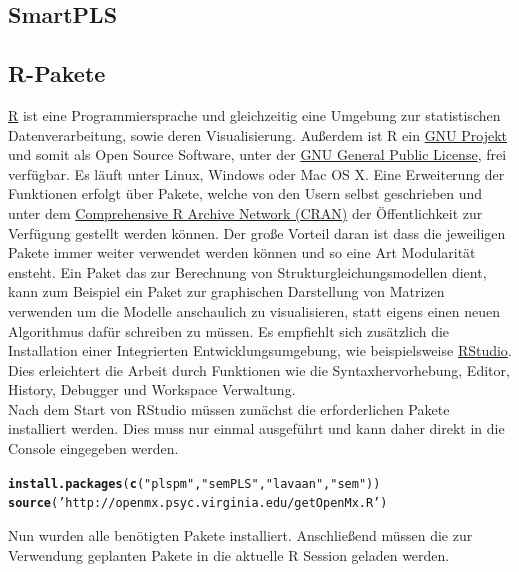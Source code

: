 \documentclass{article}\usepackage[]{graphicx}\usepackage[]{color}
\makeatletter
\newcommand{\hlstr}[1]{\textcolor[rgb]{0.192,0.494,0.8}{#1}}%
\newcommand{\hlstd}[1]{\textcolor[rgb]{0.345,0.345,0.345}{#1}}%
\newcommand{\hlkwd}[1]{\textcolor[rgb]{0.737,0.353,0.396}{\textbf{#1}}}%
\newenvironment{kframe}{%
 \def\at@end@of@kframe{}%
 \ifinner\ifhmode%
  \def\at@end@of@kframe{\end{minipage}}%
  \begin{minipage}{\columnwidth}%
 \fi\fi%
 \def\FrameCommand##1{\hskip\@totalleftmargin \hskip-\fboxsep
 \colorbox{shadecolor}{##1}\hskip-\fboxsep
     \hskip-\linewidth \hskip-\@totalleftmargin \hskip\columnwidth}%
 \MakeFramed {\advance\hsize-\width
   \@totalleftmargin\z@ \linewidth\hsize
   \@setminipage}}%
 {\par\unskip\endMakeFramed%
 \at@end@of@kframe}
\newenvironment{knitrout}{}{} %
\makeatother
\begin{document}
\subsection{SmartPLS}

\subsection{R-Pakete}
\href{http://www.r-project.org/}{R} ist eine Programmiersprache und gleichzeitig eine Umgebung zur statistischen Datenverarbeitung, sowie deren Visualisierung. Außerdem ist R ein \href{http://www.gnu.org/}{GNU Projekt} und somit als Open Source Software, unter der \href{http://www.r-project.org/COPYING}{GNU General Public License}, frei verfügbar. Es läuft unter Linux, Windows oder Mac OS X. Eine Erweiterung der Funktionen erfolgt über Pakete, welche von den Usern selbst geschrieben und unter dem \href{http://cran.r-project.org/}{Comprehensive R Archive Network (CRAN)} der Öffentlichkeit zur Verfügung gestellt werden können. Der große Vorteil daran ist dass die jeweiligen Pakete immer weiter verwendet werden können und so eine Art Modularität ensteht. Ein Paket das zur Berechnung von Strukturgleichungsmodellen dient, kann zum Beispiel ein Paket zur graphischen Darstellung von Matrizen verwenden um die Modelle anschaulich zu visualisieren, statt eigens einen neuen Algorithmus dafür schreiben zu müssen. Es empfiehlt sich zusätzlich die Installation einer Integrierten Entwicklungsumgebung, wie beispielsweise \href{http://www.rstudio.com/}{RStudio}. Dies erleichtert die Arbeit durch Funktionen wie die Syntaxhervorhebung, Editor, History, Debugger und Workspace Verwaltung.\\
Nach dem Start von RStudio müssen zunächst die erforderlichen Pakete installiert werden. Dies muss nur einmal ausgeführt und kann daher direkt in die Console eingegeben werden.

\begin{knitrout}
\color{fgcolor}\begin{kframe}
\begin{alltt}
\hlkwd{install.packages}\hlstd{(}\hlkwd{c}\hlstd{(}\hlstr{"plspm"}\hlstd{,}\hlstr{"semPLS"}\hlstd{,}\hlstr{"lavaan"}\hlstd{,}\hlstr{"sem"}\hlstd{))}
\hlkwd{source}\hlstd{(}\hlstr{'http://openmx.psyc.virginia.edu/getOpenMx.R'}\hlstd{)}
\end{alltt}
\end{kframe}
\end{knitrout}
Nun wurden alle benötigten Pakete installiert. Anschließend müssen die zur Verwendung geplanten Pakete in die aktuelle R Session geladen werden.
\end{document}
